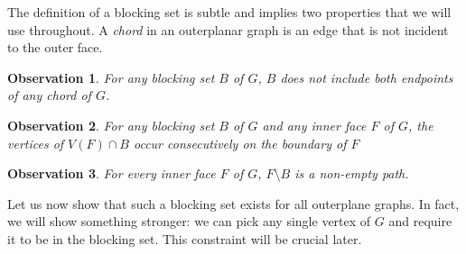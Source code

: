 \documentclass{patmorin}
\newtheorem{obs}{Observation}[theorem]
\begin{document}
The definition of a blocking set is subtle and implies two properties
that
 we will use throughout.
 A \emph{chord} in an outerplanar graph
is an edge that is not incident
 to the outer face.


\begin{obs}
   For any blocking set $B$ of $G$, $B$ does not include both endpoints
   of any chord of $G$.
\end{obs}

\begin{obs}
   For any blocking set $B$ of $G$ and any inner face $F$ of $G$, the
   vertices of $V(F)\cap B$ occur consecutively on the boundary of $F$ 
\end{obs}

\begin{obs}
  For every inner face $F$ of $G$, $F \setminus B$ is a non-empty path.
  \label{claim:facesMinusBarePaths}
\end{obs}
 


Let us now show that such a blocking set exists for all outerplane graphs. In fact, we will show something stronger:  we can pick any single vertex of $G$ and require it to be in the blocking set. This constraint will be crucial later.
\end{document}
